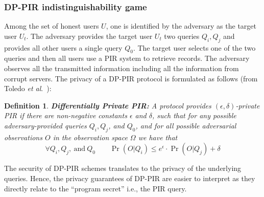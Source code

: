 \documentclass[USenglish,oneside,twocolumn]{article}
\newcommand{\etal}{\textit{et al}.}
\newtheorem{defn}{Definition}
\begin{document}
\vspace{-6mm}
\subsubsection{DP-PIR indistinguishability game}\label{subsubsec:game}
\vspace{-4mm}

\noindent Among the set of honest users $U$, one is identified by the adversary as the target user $U_t$. The adversary provides the target user $U_t$ two queries $Q_i, Q_j$ and provides all other users a single query $Q_0$. The target user selects one of the two queries and then all users use a PIR system to retrieve records. The adversary observes all the transmitted information including all the information from corrupt servers. The privacy of a DP-PIR protocol is formulated as follows (from Toledo \etal~\cite{goldbergDPPIR}):
\begin{defn}\label{defn:DPPIR}
\textbf{Differentially Private PIR:} \textit{A protocol provides $(\epsilon, \delta)$-private PIR if there are non-negative constants $\epsilon$ and $\delta$, such that for any possible adversary-provided queries $Q_i, Q_j$, and $Q_0$, and for all possible adversarial observations $O$ in the observation space $\Omega$ we have that
\begin{equation}
\forall Q_i, Q_j, \ \mathrm{and} \ Q_0 \qquad \Pr (O | Q_i) \leq e^\epsilon \cdot  \Pr (O | Q_j) + \delta
\end{equation}
}
\end{defn}

The security of DP-PIR schemes translates to the privacy of the underlying queries. Hence, the privacy guarantees of DP-PIR are easier to interpret as they directly relate to the ``program secret'' i.e., the PIR query.

\vspace{-6mm}
\end{document}
